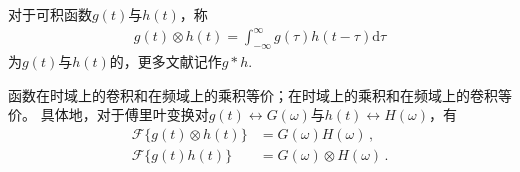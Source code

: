 \begin{definition}
    对于可积函数$g(t)$与$h(t)$，称
    \begin{align}
        g(t)\otimes h(t)=\int_{-\infty}^{\infty}g(\tau)h(t-\tau)\mathrm{d}\tau
    \end{align}
    为$g(t)$与$h(t)$的，更多文献记作$g\ast h$.
\end{definition}
\begin{theorem}
    函数在时域上的卷积和在频域上的乘积等价；在时域上的乘积和在频域上的卷积等价。
    具体地，对于傅里叶变换对$g(t)\leftrightarrow G(\omega)$与$h(t)\leftrightarrow H(\omega)$，有
    \begin{align}
        \mathcal{F}\{g(t)\otimes h(t)\} & =G(\omega)H(\omega)\, ,         \\
        \mathcal{F}\{g(t)h(t)\}         & =G(\omega)\otimes H(\omega)\, .
    \end{align}
\end{theorem}
